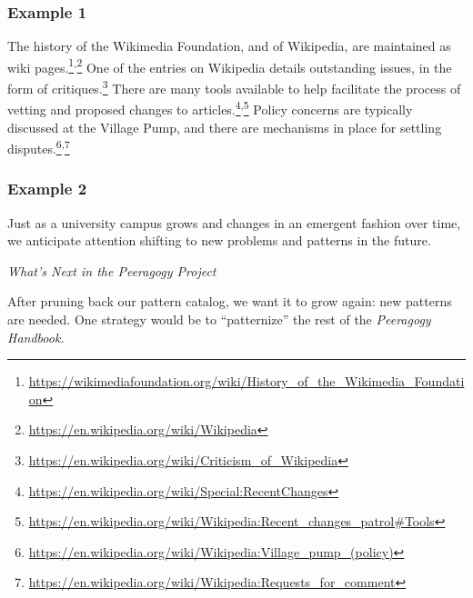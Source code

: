 \subsubsection*{Example 1} 
The history of the Wikimedia Foundation, and of Wiki\-pedia, are
maintained as wiki
pages.\footnote{\url{https://wikimediafoundation.org/wiki/History_of_the_Wikimedia_Foundation}}\textsuperscript{,}\footnote{\url{https://en.wikipedia.org/wiki/Wikipedia}}
One of the entries on Wikipedia details outstanding issues, in the
form of
critiques.\footnote{\url{https://en.wikipedia.org/wiki/Criticism_of_Wikipedia}}
There are many tools available to help facilitate the process of
vetting and proposed changes to
articles.\footnote{\url{https://en.wikipedia.org/wiki/Special:RecentChanges}}\textsuperscript{,}\footnote{\url{https://en.wikipedia.org/wiki/Wikipedia:Recent_changes_patrol\#Tools}}
Policy concerns are typically discussed at the Village Pump, and there
are mechanisms in place for settling
disputes.\footnote{\url{https://en.wikipedia.org/wiki/Wikipedia:Village_pump_(policy)}}\textsuperscript{,}\footnote{\url{https://en.wikipedia.org/wiki/Wikipedia:Requests_for_comment}}

\subsubsection*{Example 2} 
Just as a university campus grows and changes in an emergent fashion
over time, we anticipate attention shifting to new problems and patterns in the
future.


\begin{framed}
\noindent 
\emph{What's Next in the Peeragogy Project}
\begin{collectinmacro}{\ScrapbookWN}{}{}
After pruning back our pattern catalog, we want it to grow again: new patterns are needed.
One strategy would be to ``patternize'' the rest of the \emph{Peeragogy Handbook.}
\end{collectinmacro}
\ScrapbookWN
\end{framed}


\newpage
